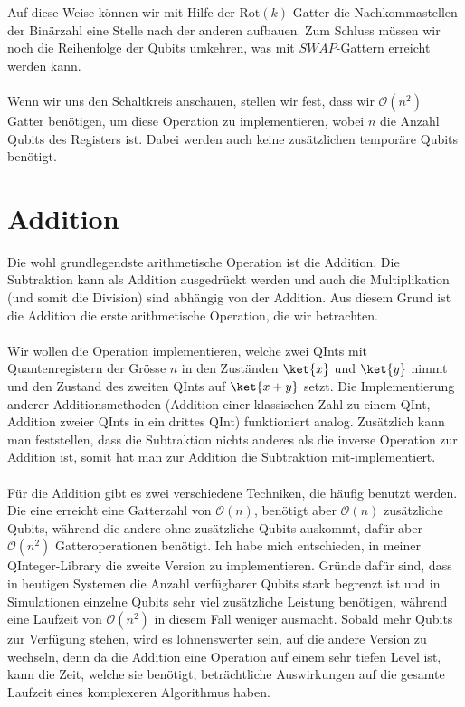 Auf diese Weise können wir mit Hilfe der $\text{Rot}(k)$-Gatter die Nachkommastellen der Binärzahl eine Stelle nach der anderen aufbauen. Zum Schluss müssen wir noch die Reihenfolge der Qubits umkehren, was mit $SWAP$-Gattern erreicht werden kann.

\paragraph{}
Wenn wir uns den Schaltkreis anschauen, stellen wir fest, dass wir $\mathcal O(n^2)$ Gatter benötigen, um diese Operation zu implementieren, wobei $n$ die Anzahl Qubits des Registers ist. Dabei werden auch keine zusätzlichen temporäre Qubits benötigt. 

\section{Addition}
Die wohl grundlegendste arithmetische Operation ist die Addition. Die Subtraktion kann als Addition ausgedrückt werden und auch die Multiplikation (und somit die Division) sind abhängig von der Addition. Aus diesem Grund ist die Addition die erste arithmetische Operation, die wir betrachten. 
\paragraph{}
Wir wollen die Operation implementieren, welche zwei QInts mit Quantenregistern der Grösse $n$ in den Zuständen $\ket{x}$ und $\ket{y}$ nimmt und den Zustand des zweiten QInts auf $\ket{x + y}$ setzt. Die Implementierung anderer Additionsmethoden (Addition einer klassischen Zahl zu einem QInt, Addition zweier QInts in ein drittes QInt) funktioniert analog. Zusätzlich kann man feststellen, dass die Subtraktion nichts anderes als die inverse Operation zur Addition ist, somit hat man zur Addition die Subtraktion mit-implementiert.

\paragraph{}

Für die Addition gibt es zwei verschiedene Techniken, die häufig benutzt werden. Die eine erreicht eine Gatterzahl von $\mathcal O(n)$, benötigt aber $\mathcal O(n)$ zusätzliche Qubits, während die andere ohne zusätzliche Qubits auskommt, dafür aber $\mathcal O(n^2)$ Gatteroperationen benötigt. Ich habe mich entschieden, in meiner QInteger-Library die zweite Version zu implementieren. Gründe dafür sind, dass in heutigen Systemen die Anzahl verfügbarer Qubits stark begrenzt ist und in Simulationen einzelne Qubits sehr viel zusätzliche Leistung benötigen, während eine Laufzeit von $\mathcal O(n^2)$ in diesem Fall weniger ausmacht. Sobald mehr Qubits zur Verfügung stehen, wird es lohnenswerter sein, auf die andere Version zu wechseln, denn da die Addition eine Operation auf einem sehr tiefen Level ist, kann die Zeit, welche sie benötigt, beträchtliche Auswirkungen auf die gesamte Laufzeit eines komplexeren Algorithmus haben.

